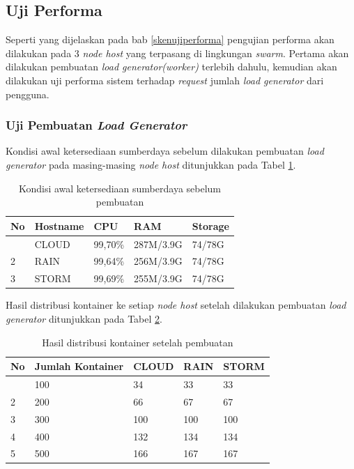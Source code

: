 		\subsection{Uji Performa}
			Seperti yang dijelaskan pada bab \ref{skenujiperforma} pengujian performa akan dilakukan pada 3 \textit{node host} yang terpasang di lingkungan \textit{swarm}. Pertama akan dilakukan pembuatan \textit{load generator(worker)} terlebih dahulu, kemudian akan dilakukan uji performa sistem terhadap \textit{request} jumlah \textit{load generator} dari pengguna.
			
			\subsubsection{Uji Pembuatan \textit{Load Generator}}
				Kondisi awal ketersediaan sumberdaya sebelum dilakukan pembuatan \textit{load generator} pada masing-masing \textit{node host} ditunjukkan pada Tabel \ref{suberdayaawalpembuatan}.
				\begin{longtable}{|p{}|p{}|p{}|p{}|p{}|}
					\caption{Kondisi awal ketersediaan sumberdaya sebelum pembuatan} \label{suberdayaawalpembuatan} \\
					\hline
					\textbf{No} & \textbf{Hostname} & \textbf{CPU} & \textbf{RAM} & \textbf{Storage} \\ \hline
					\endhead
					\endfoot
					\endlastfoot
					1 & CLOUD & 99,70\% & 287M/3.9G & 74/78G \\ \hline
					2 & RAIN & 99,64\% & 256M/3.9G & 74/78G \\ \hline
					3 & STORM & 99,69\% & 255M/3.9G & 74/78G \\ \hline
				\end{longtable}
			
				Hasil distribusi kontainer ke setiap \textit{node host} setelah dilakukan pembuatan \textit{load generator} ditunjukkan pada Tabel \ref{jumlahkontainerpem}.
				\begin{longtable}{|p{}|p{}|p{0.15\textwidth}|p{}|p{}|}
					\caption{Hasil distribusi kontainer setelah pembuatan} \label{jumlahkontainerpem} \\
					\hline
					\textbf{No} & \textbf{Jumlah Kontainer} & \textbf{CLOUD} & \textbf{RAIN} & \textbf{STORM} \\ \hline
					\endhead
					\endfoot
					\endlastfoot
					1 & 100 & 34 & 33 & 33 \\ \hline
					2 & 200 & 66 & 67 & 67 \\ \hline
					3 & 300 & 100 & 100 & 100 \\ \hline
					4 & 400 & 132 & 134 & 134 \\ \hline
					5 & 500 & 166 & 167 & 167 \\ \hline
				\end{longtable}
				
